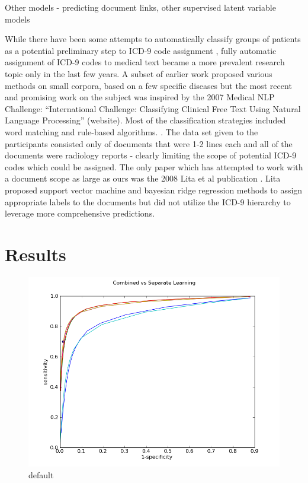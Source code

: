 \documentclass{article}
\begin{document}
Other models - predicting document links, other supervised latent
variable models

While there have been some attempts to automatically classify groups
of patients as a potential preliminary step to ICD-9 code assignment
\citep{Ruch2008,FreitasJunior2006,RibeiroNeto2001,Brown2006}, fully
automatic assignment of ICD-9 codes to medical text became a more
prevalent research topic only in the last few years. A subset of earlier
work proposed various methods on small corpora, based on a few specific
diseases \citep{Rao2003} but the most recent and promising work on
the subject was inspired by the 2007 Medical NLP Challenge: \textquotedblleft{}International
Challenge: Classifying Clinical Free Text Using Natural Language Processing\textquotedblright{}
(website). Most of the classification strategies included word matching
and rule-based algorithms. \citep{Goldstein2007,Crammer2007,Farkas2008}.
The data set given to the participants consisted only of documents
that were 1-2 lines each and all of the documents were radiology reports
- clearly limiting the scope of potential ICD-9 codes which could
be assigned. The only paper which has attempted to work with a document
scope as large as ours was the 2008 Lita et al publication \citep{Lita2008}.
Lita proposed support vector machine and bayesian ridge regression
methods to assign appropriate labels to the documents but did not
utilize the ICD-9 hierarchy to leverage more comprehensive predictions.

\section{Results}

\begin{figure}[htbp]
\begin{center}
\includegraphics[width=1\textwidth]{Combined_vs_Separate_Learning.png}
\caption{default}
\label{default}
\end{center}
\end{figure}
\end{document}
